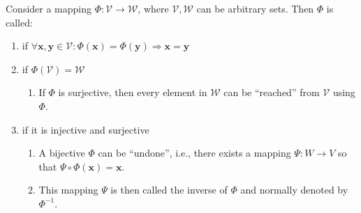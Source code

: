 Consider a mapping $\Phi : \mathcal{V} \to \mathcal{W}$, where $\mathcal{V}, \mathcal{W}$ can be arbitrary sets.
Then $\Phi$ is called:
\hfill \cite{mfml/book/mml/Deisenroth-Faisal-Ong}

\begin{enumerate}
    \item
    \begin{definition}[Injective]
        if $\forall \bm{x}, \bm{y} \in \mathcal{V} : \Phi(\bm{x}) = \Phi(\bm{y}) \Rightarrow \bm{x} = \bm{y}$
        \hfill \cite{mfml/book/mml/Deisenroth-Faisal-Ong}
    \end{definition}

    \item
    \begin{definition}[Surjective]
        if $\Phi(\mathcal{V}) = \mathcal{W}$
        \hfill \cite{mfml/book/mml/Deisenroth-Faisal-Ong}
    \end{definition}
    \begin{enumerate}
        \item If $\Phi$ is surjective, then every element in $\mathcal{W}$ can be “reached” from $\mathcal{V}$ using $\Phi$.
        \hfill \cite{mfml/book/mml/Deisenroth-Faisal-Ong}
    \end{enumerate}

    \item
    \begin{definition}[Bijective]
        if it is injective and surjective
        \hfill \cite{mfml/book/mml/Deisenroth-Faisal-Ong}
    \end{definition}
    \begin{enumerate}
        \item A bijective $\Phi$ can be “undone”, i.e., there exists a mapping $\Psi : W \to V$ so that $\Psi \circ \Phi(\bm{x}) = \bm{x}$.
        \hfill \cite{mfml/book/mml/Deisenroth-Faisal-Ong}

        \item This mapping $\Psi$ is then called the inverse of $\Phi$ and normally denoted by $\Phi^{-1}$.
        \hfill \cite{mfml/book/mml/Deisenroth-Faisal-Ong}
    \end{enumerate}

\end{enumerate}


















